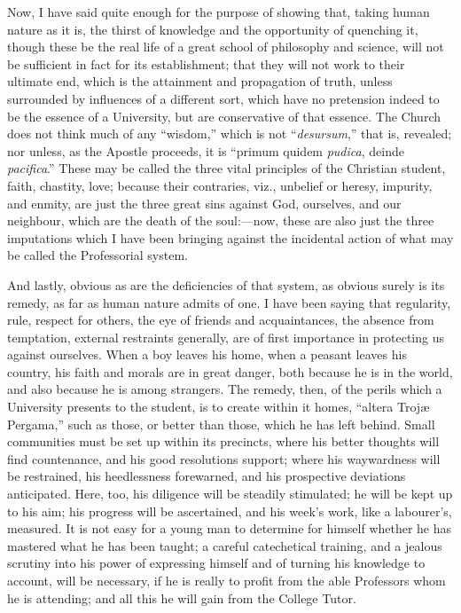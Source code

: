 Now, I have said quite enough
for the purpose of showing that, taking human nature as it is, the
thirst of knowledge and the opportunity of quenching it, though these be the real life of a great school of philosophy and science,
will not be sufficient in fact for its establishment; that they will
not work to their ultimate end, which is the attainment and
propagation of truth, unless surrounded by influences of a different
sort, which have no pretension indeed to be the essence of a
University, but are conservative of that essence. The Church does not
think much of any ``wisdom,'' which is not ``\emph{desursum},''
that is, revealed; nor unless, as the Apostle proceeds, it is ``primum quidem \emph{pudica}, deinde \emph{pacifica}.'' These may
be called the three vital principles of the Christian student, faith,
chastity, love; because their contraries, viz., unbelief or heresy,
impurity, and enmity, are just the three great sins against God,
ourselves, and our neighbour, which are the death of the soul:—now,
these are also just the three imputations which I have been bringing
against the incidental action of what may be called the Professorial
system.

And lastly, obvious as are the
deficiencies of that system, as obvious surely is its remedy, as far
as human nature admits of one. I have been saying that regularity,
rule, respect for others, the eye of friends and acquaintances, the
absence from temptation, external restraints generally, are of first
importance in protecting us against ourselves. When a boy leaves his
home, when a peasant leaves his country, his faith and morals are in
great danger, both because he is in the world, and also because he is
among strangers. The remedy, then, of the perils which a University
presents to the student, is to create within it homes, ``altera Trojæ
Pergama,'' such as those, or better than those, which he has left
behind. Small communities must be set up within its precincts, where
his better thoughts will find countenance, and his good resolutions
support; where his waywardness will be restrained, his
heedlessness forewarned, and his prospective deviations anticipated.
Here, too, his diligence will be steadily stimulated; he will be kept
up to his aim; his progress will be ascertained, and his week's work,
like a labourer's, measured. It is not easy for a young man to
determine for himself whether he has mastered what he has been taught;
a careful catechetical training, and a jealous scrutiny into his power
of expressing himself and of turning his knowledge to account, will be
necessary, if he is really to profit from the able Professors whom he
is attending; and all this he will gain from the College Tutor.

